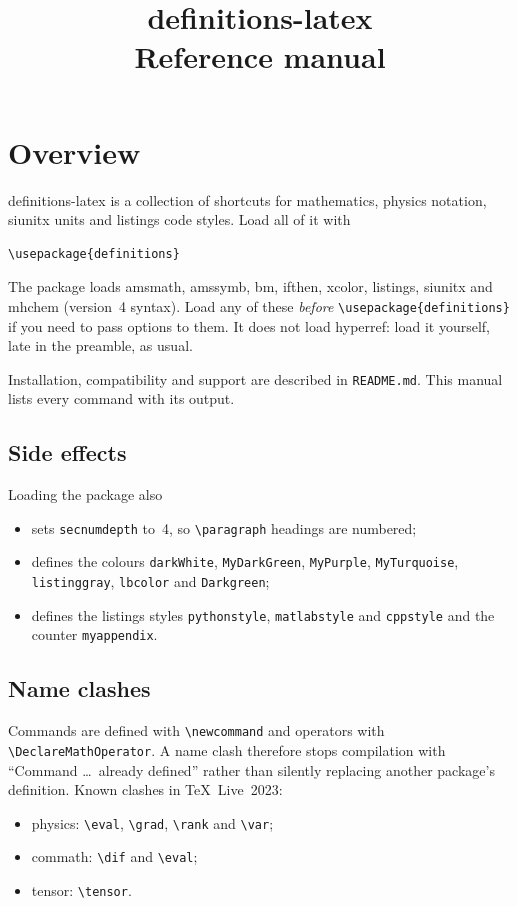\documentclass[11pt,a4paper]{article}
\title{\textsf{definitions-latex}\\[2pt]
  \large Reference manual}
\author{}
\date{\texttt{\pkginfo}}
\begin{document}
\maketitle

\section{Overview}

\textsf{definitions-latex} is a collection of shortcuts for mathematics,
physics notation, \textsf{siunitx} units and \textsf{listings} code styles.
Load all of it with
\begin{verbatim}
\usepackage{definitions}
\end{verbatim}
The package loads \textsf{amsmath}, \textsf{amssymb}, \textsf{bm},
\textsf{ifthen}, \textsf{xcolor}, \textsf{listings}, \textsf{siunitx} and
\textsf{mhchem} (version~4 syntax).  Load any of these \emph{before}
\verb|\usepackage{definitions}| if you need to pass options to them.
It does not load \textsf{hyperref}: load it yourself, late in the preamble,
as usual.

Installation, compatibility and support are described in
\texttt{README.md}.  This manual lists every command with its output.

\subsection*{Side effects}
Loading the package also
\begin{itemize}
  \item sets \verb|secnumdepth| to~4, so \verb|\paragraph| headings are
        numbered;
  \item defines the colours \texttt{darkWhite}, \texttt{MyDarkGreen},
        \texttt{MyPurple}, \texttt{MyTurquoise}, \texttt{listinggray},
        \texttt{lbcolor} and \texttt{Darkgreen};
  \item defines the \textsf{listings} styles \texttt{pythonstyle},
        \texttt{matlabstyle} and \texttt{cppstyle} and the counter
        \texttt{myappendix}.
\end{itemize}

\subsection*{Name clashes}
Commands are defined with \verb|\newcommand| and operators with
\verb|\DeclareMathOperator|.  A name clash therefore stops compilation
with ``Command \dots\ already defined'' rather than silently replacing
another package's definition.  Known clashes in \TeX\ Live~2023:
\begin{itemize}
  \item \textsf{physics}: \verb|\eval|, \verb|\grad|, \verb|\rank| and
        \verb|\var|;
  \item \textsf{commath}: \verb|\dif| and \verb|\eval|;
  \item \textsf{tensor}: \verb|\tensor|.
\end{itemize}
\end{document}
